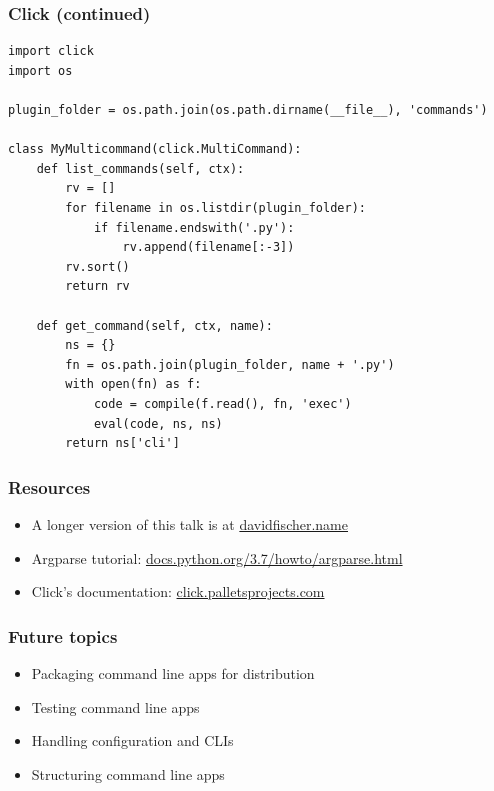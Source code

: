 \documentclass[handout]{beamer}
\begin{document}
\begin{frame}[fragile]
\frametitle{Click (continued)}

{\scriptsize
\begin{verbatim}
import click
import os

plugin_folder = os.path.join(os.path.dirname(__file__), 'commands')

class MyMulticommand(click.MultiCommand):
    def list_commands(self, ctx):
        rv = []
        for filename in os.listdir(plugin_folder):
            if filename.endswith('.py'):
                rv.append(filename[:-3])
        rv.sort()
        return rv

    def get_command(self, ctx, name):
        ns = {}
        fn = os.path.join(plugin_folder, name + '.py')
        with open(fn) as f:
            code = compile(f.read(), fn, 'exec')
            eval(code, ns, ns)
        return ns['cli']
\end{verbatim}
}

\end{frame}



\begin{frame}
\frametitle{Resources}
  \begin{itemize}
    \item {\small A longer version of this talk is at \href{https://www.davidfischer.name}{davidfischer.name}}
    \item {\small Argparse tutorial: \href{https://docs.python.org/3.7/howto/argparse.html}{docs.python.org/3.7/howto/argparse.html}}
    \item {\small Click's documentation: \href{https://click.palletsprojects.com/}{click.palletsprojects.com}}
  \end{itemize}
\end{frame}


\begin{frame}
\frametitle{Future topics}
  \begin{itemize}
    \item {\small Packaging command line apps for distribution}
    \item {\small Testing command line apps}
    \item {\small Handling configuration and CLIs}
    \item {\small Structuring command line apps}
  \end{itemize}
\end{frame}
\end{document}
